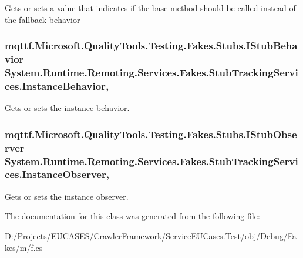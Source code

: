 Gets or sets a value that indicates if the base method should be called instead of the fallback behavior

\hypertarget{class_system_1_1_runtime_1_1_remoting_1_1_services_1_1_fakes_1_1_stub_tracking_services_a0523db8ac4930140fea8f161d65424ce}{
\subsubsection[{Instance\-Behavior}]{\setlength{\rightskip}{0pt plus 5cm}mqttf.\-Microsoft.\-Quality\-Tools.\-Testing.\-Fakes.\-Stubs.\-I\-Stub\-Behavior System.\-Runtime.\-Remoting.\-Services.\-Fakes.\-Stub\-Tracking\-Services.\-Instance\-Behavior\hspace{0.3cm}{\ttfamily [get]}, {\ttfamily [set]}}}\label{class_system_1_1_runtime_1_1_remoting_1_1_services_1_1_fakes_1_1_stub_tracking_services_a0523db8ac4930140fea8f161d65424ce}


Gets or sets the instance behavior.

\hypertarget{class_system_1_1_runtime_1_1_remoting_1_1_services_1_1_fakes_1_1_stub_tracking_services_a69b44c821214c3505640fc3dfe9d4389}{
\subsubsection[{Instance\-Observer}]{\setlength{\rightskip}{0pt plus 5cm}mqttf.\-Microsoft.\-Quality\-Tools.\-Testing.\-Fakes.\-Stubs.\-I\-Stub\-Observer System.\-Runtime.\-Remoting.\-Services.\-Fakes.\-Stub\-Tracking\-Services.\-Instance\-Observer\hspace{0.3cm}{\ttfamily [get]}, {\ttfamily [set]}}}\label{class_system_1_1_runtime_1_1_remoting_1_1_services_1_1_fakes_1_1_stub_tracking_services_a69b44c821214c3505640fc3dfe9d4389}


Gets or sets the instance observer.



The documentation for this class was generated from the following file\-:\begin{DoxyCompactItemize}
\item 
D\-:/\-Projects/\-E\-U\-C\-A\-S\-E\-S/\-Crawler\-Framework/\-Service\-E\-U\-Cases.\-Test/obj/\-Debug/\-Fakes/m/\hyperlink{m_2f_8cs}{f.\-cs}\end{DoxyCompactItemize}
